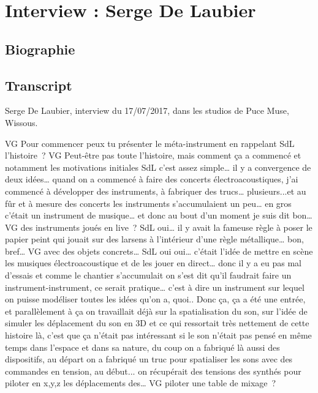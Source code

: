 \chapter{Interview : Serge De Laubier}
\label{appendix:delaubier}

\section*{Biographie}


\section*{Transcript}
Serge De Laubier, interview du 17/07/2017, dans les studios de Puce Muse, Wissous.


VG Pour commencer peux tu présenter le méta-instrument en rappelant 
SdL l'histoire ? 
VG Peut-être pas toute l'histoire, mais comment ça a commencé et notamment les motivations initiales 
SdL c'est assez simple… il y a convergence de deux idées… quand on a commencé à faire des concerts électroacoustiques, j'ai commencé à développer des instruments, à fabriquer des trucs… plusieurs...et au fûr et à mesure des concerts les instruments s'accumulaient un peu… en gros c'était un instrument de musique… et donc au bout d'un moment je suis dit bon… 
VG des instruments joués en live ? 
SdL oui… il y avait la fameuse règle à poser le papier peint qui jouait sur des larsens à l'intérieur d'une règle métallique… bon, bref…  
VG avec des objets concrets… 
SdL oui oui… c'était l'idée de mettre en scène les musiques électroacoustique et de les jouer en direct… donc il y a eu pas mal d'essais et comme le chantier s'accumulait on s'est dit qu'il faudrait faire un instrument-instrument, ce serait pratique… c'est à dire un instrument sur lequel on puisse modéliser toutes les idées qu'on a, quoi.. Donc ça, ça a été une entrée, et parallèlement à ça on travaillait déjà sur la spatialisation du son, sur l'idée de simuler les déplacement du son en 3D et ce qui ressortait très nettement de cette histoire là, c'est que ça n'était pas intéressant si le son n'était pas pensé en même temps dans l'espace et dans sa nature, du coup on a fabriqué là aussi des dispositifs, au départ on a fabriqué un truc pour spatialiser les sons avec des commandes en tension, au début... on récupérait des tensions des synthés pour piloter en x,y,z les déplacements des… 
VG piloter une table de mixage ? 

